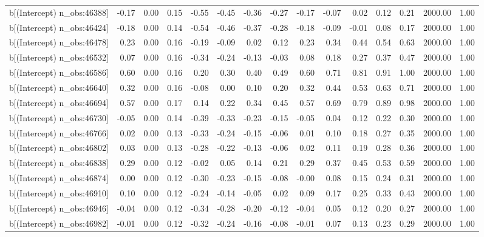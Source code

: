 \begin{table}[ht]
\begin{tabular}{rrrrrrrrrrrrrrr}
  b[(Intercept) n\_obs:46388] & -0.17 & 0.00 & 0.15 & -0.55 & -0.45 & -0.36 & -0.27 & -0.17 & -0.07 & 0.02 & 0.12 & 0.21 & 2000.00 & 1.00 \\ 
  b[(Intercept) n\_obs:46424] & -0.18 & 0.00 & 0.14 & -0.54 & -0.46 & -0.37 & -0.28 & -0.18 & -0.09 & -0.01 & 0.08 & 0.17 & 2000.00 & 1.00 \\ 
  b[(Intercept) n\_obs:46478] & 0.23 & 0.00 & 0.16 & -0.19 & -0.09 & 0.02 & 0.12 & 0.23 & 0.34 & 0.44 & 0.54 & 0.63 & 2000.00 & 1.00 \\ 
  b[(Intercept) n\_obs:46532] & 0.07 & 0.00 & 0.16 & -0.34 & -0.24 & -0.13 & -0.03 & 0.08 & 0.18 & 0.27 & 0.37 & 0.47 & 2000.00 & 1.00 \\ 
  b[(Intercept) n\_obs:46586] & 0.60 & 0.00 & 0.16 & 0.20 & 0.30 & 0.40 & 0.49 & 0.60 & 0.71 & 0.81 & 0.91 & 1.00 & 2000.00 & 1.00 \\ 
  b[(Intercept) n\_obs:46640] & 0.32 & 0.00 & 0.16 & -0.08 & 0.00 & 0.10 & 0.20 & 0.32 & 0.44 & 0.53 & 0.63 & 0.71 & 2000.00 & 1.00 \\ 
  b[(Intercept) n\_obs:46694] & 0.57 & 0.00 & 0.17 & 0.14 & 0.22 & 0.34 & 0.45 & 0.57 & 0.69 & 0.79 & 0.89 & 0.98 & 2000.00 & 1.00 \\ 
  b[(Intercept) n\_obs:46730] & -0.05 & 0.00 & 0.14 & -0.39 & -0.33 & -0.23 & -0.15 & -0.05 & 0.04 & 0.12 & 0.22 & 0.30 & 2000.00 & 1.00 \\ 
  b[(Intercept) n\_obs:46766] & 0.02 & 0.00 & 0.13 & -0.33 & -0.24 & -0.15 & -0.06 & 0.01 & 0.10 & 0.18 & 0.27 & 0.35 & 2000.00 & 1.00 \\ 
  b[(Intercept) n\_obs:46802] & 0.03 & 0.00 & 0.13 & -0.28 & -0.22 & -0.13 & -0.06 & 0.02 & 0.11 & 0.19 & 0.28 & 0.36 & 2000.00 & 1.00 \\ 
  b[(Intercept) n\_obs:46838] & 0.29 & 0.00 & 0.12 & -0.02 & 0.05 & 0.14 & 0.21 & 0.29 & 0.37 & 0.45 & 0.53 & 0.59 & 2000.00 & 1.00 \\ 
  b[(Intercept) n\_obs:46874] & 0.00 & 0.00 & 0.12 & -0.30 & -0.23 & -0.15 & -0.08 & -0.00 & 0.08 & 0.15 & 0.24 & 0.31 & 2000.00 & 1.00 \\ 
  b[(Intercept) n\_obs:46910] & 0.10 & 0.00 & 0.12 & -0.24 & -0.14 & -0.05 & 0.02 & 0.09 & 0.17 & 0.25 & 0.33 & 0.43 & 2000.00 & 1.00 \\ 
  b[(Intercept) n\_obs:46946] & -0.04 & 0.00 & 0.12 & -0.34 & -0.28 & -0.20 & -0.12 & -0.04 & 0.05 & 0.12 & 0.20 & 0.27 & 2000.00 & 1.00 \\ 
  b[(Intercept) n\_obs:46982] & -0.01 & 0.00 & 0.12 & -0.32 & -0.24 & -0.16 & -0.08 & -0.01 & 0.07 & 0.13 & 0.23 & 0.29 & 2000.00 & 1.00 \\ 

\end{tabular}
\end{table}
